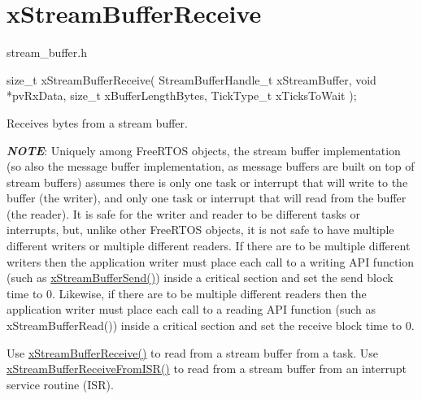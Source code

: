 \hypertarget{group__xStreamBufferReceive}{}\section{x\+Stream\+Buffer\+Receive}
\label{group__xStreamBufferReceive}
stream\+\_\+buffer.\+h


\begin{DoxyPre}
size\_t xStreamBufferReceive( StreamBufferHandle\_t xStreamBuffer,
                             void *pvRxData,
                             size\_t xBufferLengthBytes,
                             TickType\_t xTicksToWait );
\end{DoxyPre}


Receives bytes from a stream buffer.

{\itshape {\bfseries N\+O\+TE}}\+: Uniquely among Free\+R\+T\+OS objects, the stream buffer implementation (so also the message buffer implementation, as message buffers are built on top of stream buffers) assumes there is only one task or interrupt that will write to the buffer (the writer), and only one task or interrupt that will read from the buffer (the reader). It is safe for the writer and reader to be different tasks or interrupts, but, unlike other Free\+R\+T\+OS objects, it is not safe to have multiple different writers or multiple different readers. If there are to be multiple different writers then the application writer must place each call to a writing A\+PI function (such as \hyperlink{stream__buffer_8h_a35cdf3b6bf677086b9128782f762499d}{x\+Stream\+Buffer\+Send()}) inside a critical section and set the send block time to 0. Likewise, if there are to be multiple different readers then the application writer must place each call to a reading A\+PI function (such as x\+Stream\+Buffer\+Read()) inside a critical section and set the receive block time to 0.

Use \hyperlink{stream__buffer_8h_a55efc144b988598d84a6087d3e20b507}{x\+Stream\+Buffer\+Receive()} to read from a stream buffer from a task. Use \hyperlink{stream__buffer_8h_a6c882a1d9f26c40f93f271bd1b844b3b}{x\+Stream\+Buffer\+Receive\+From\+I\+S\+R()} to read from a stream buffer from an interrupt service routine (I\+SR).


